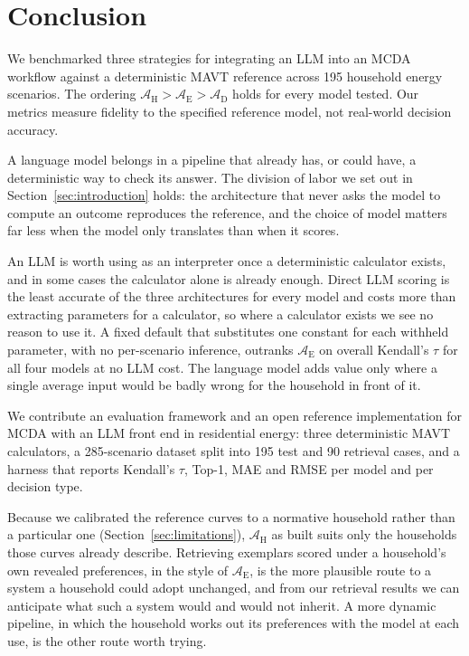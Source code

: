 \documentclass[final,3p,times]{elsarticle}
\begin{document}
\section{Conclusion}
\label{sec:conclusion}
We benchmarked three strategies for integrating an LLM into an MCDA workflow against a deterministic MAVT reference across 195 household energy scenarios. The ordering $\mathcal{A}_{\text{H}} > \mathcal{A}_{\text{E}} > \mathcal{A}_{\text{D}}$ holds for every model tested. Our metrics measure fidelity to the specified reference model, not real-world decision accuracy.

A language model belongs in a pipeline that already has, or could have, a deterministic way to check its answer. The division of labor we set out in Section~\ref{sec:introduction} holds: the architecture that never asks the model to compute an outcome reproduces the reference, and the choice of model matters far less when the model only translates than when it scores.

An LLM is worth using as an interpreter once a deterministic calculator exists, and in some cases the calculator alone is already enough. Direct LLM scoring is the least accurate of the three architectures for every model and costs more than extracting parameters for a calculator, so where a calculator exists we see no reason to use it. A fixed default that substitutes one constant for each withheld parameter, with no per-scenario inference, outranks $\mathcal{A}_{\text{E}}$ on overall Kendall's $\tau$ for all four models at no LLM cost. The language model adds value only where a single average input would be badly wrong for the household in front of it.

We contribute an evaluation framework and an open reference implementation for MCDA with an LLM front end in residential energy: three deterministic MAVT calculators, a 285-scenario dataset split into 195 test and 90 retrieval cases, and a harness that reports Kendall's $\tau$, Top-1, MAE and RMSE per model and per decision type.

Because we calibrated the reference curves to a normative household rather than a particular one (Section~\ref{sec:limitations}), $\mathcal{A}_{\text{H}}$ as built suits only the households those curves already describe. Retrieving exemplars scored under a household's own revealed preferences, in the style of $\mathcal{A}_{\text{E}}$, is the more plausible route to a system a household could adopt unchanged, and from our retrieval results we can anticipate what such a system would and would not inherit. A more dynamic pipeline, in which the household works out its preferences with the model at each use, is the other route worth trying.
\end{document}
